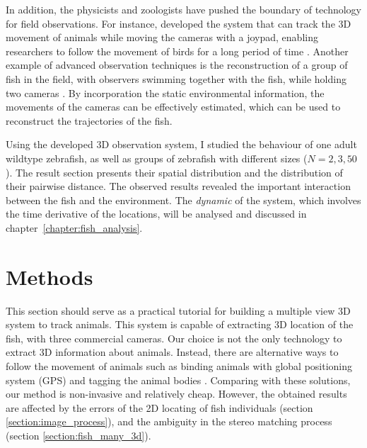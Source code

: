 \documentclass[11pt,twoside]{report}
\begin{document}
In addition, the physicists and zoologists have pushed the boundary of technology for field observations. For instance, \citeauthor{cavagna2021} developed the system that can track the 3D movement of animals while moving the cameras with a joypad, enabling researchers to follow the movement of birds for a long period of time \cite{cavagna2021}.
Another example of advanced observation techniques is the reconstruction of a group of fish in the field, with observers swimming together with the fish, while holding two cameras \cite{francisco2020me}. By incorporation the static environmental information, the movements of the cameras can be effectively estimated, which can be used to reconstruct the trajectories of the fish. 

Using the developed 3D observation system, I studied the behaviour of one adult wildtype zebrafish, as well as groups of zebrafish with different sizes ($N=2, 3, 50$). The result section presents their spatial distribution and the distribution of their pairwise distance. The observed results revealed the important interaction between the fish and the environment. The \emph{dynamic} of the system, which involves the time derivative of the locations, will be analysed and discussed in chapter~\ref{chapter:fish_analysis}.


\section{Methods}
\label{section:method_locate_3d}

This section should serve as a practical tutorial for building a multiple view 3D system to track animals. This system is capable of extracting 3D location of the fish, with three commercial cameras. Our choice is not the only technology to extract 3D information about animals. Instead, there are alternative ways to follow the movement of animals such as binding animals with global positioning system (GPS) \cite{nagy2010} and tagging the animal bodies \cite{jolles2017}. Comparing with these solutions, our method is non-invasive and relatively cheap. However, the obtained results are affected by the errors of the 2D locating of fish individuals (section \ref{section:image_process}), and the ambiguity in the stereo matching process (section \ref{section:fish_many_3d}).
\end{document}
